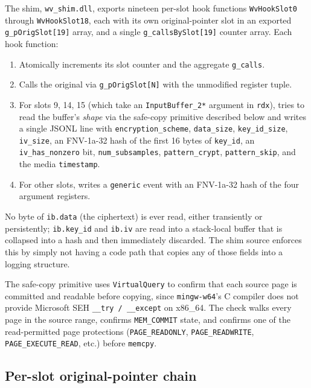 \documentclass[11pt,letterpaper]{article}
\begin{document}
The shim, \texttt{wv\_shim.dll}, exports nineteen per-slot hook
functions \texttt{WvHookSlot0} through \texttt{WvHookSlot18}, each
with its own original-pointer slot in an exported
\texttt{g\_pOrigSlot[19]} array, and a single
\texttt{g\_callsBySlot[19]} counter array. Each hook function:

\begin{enumerate}[itemsep=2pt,topsep=2pt]
  \item Atomically increments its slot counter and the aggregate
        \texttt{g\_calls}.
  \item Calls the original via \texttt{g\_pOrigSlot[N]} with the
        unmodified register tuple.
  \item For slots 9, 14, 15 (which take an \texttt{InputBuffer\_2*}
        argument in \texttt{rdx}), tries to read the buffer's
        \emph{shape} via the safe-copy primitive described below
        and writes a single JSONL line with
        \texttt{encryption\_scheme}, \texttt{data\_size},
        \texttt{key\_id\_size}, \texttt{iv\_size}, an FNV-1a-32 hash
        of the first 16 bytes of \texttt{key\_id}, an
        \texttt{iv\_has\_nonzero} bit, \texttt{num\_subsamples},
        \texttt{pattern\_crypt}, \texttt{pattern\_skip}, and the
        media \texttt{timestamp}.
  \item For other slots, writes a \texttt{generic} event with an
        FNV-1a-32 hash of the four argument registers.
\end{enumerate}

\noindent No byte of \texttt{ib.data} (the ciphertext) is ever read,
either transiently or persistently; \texttt{ib.key\_id} and
\texttt{ib.iv} are read into a stack-local buffer that is collapsed
into a hash and then immediately discarded. The shim source enforces
this by simply not having a code path that copies any of those
fields into a logging structure.

The safe-copy primitive uses \texttt{VirtualQuery} to confirm that
each source page is committed and readable before copying, since
\texttt{mingw-w64}'s C compiler does not provide Microsoft
SEH \texttt{\_\_try / \_\_except} on x86\_64. The check walks every
page in the source range, confirms \texttt{MEM\_COMMIT} state, and
confirms one of the read-permitted page protections
(\texttt{PAGE\_READONLY}, \texttt{PAGE\_READWRITE},
\texttt{PAGE\_EXECUTE\_READ}, etc.) before \texttt{memcpy}.

\subsection{Per-slot original-pointer chain}
\label{sec:runtime-orig}
\end{document}
